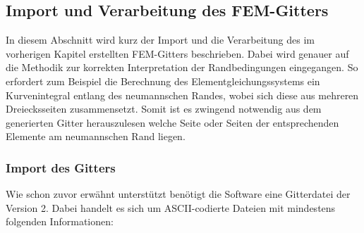 \subsection{Import und Verarbeitung des FEM-Gitters}
In diesem Abschnitt wird kurz der Import und die Verarbeitung des im vorherigen Kapitel erstellten FEM-Gitters beschrieben. Dabei wird genauer auf die Methodik zur korrekten Interpretation der Randbedingungen eingegangen. So erfordert zum Beispiel die Berechnung des Elementgleichungssystems ein Kurvenintegral entlang des neumannschen Randes, wobei sich diese aus mehreren Dreiecksseiten zusammensetzt. Somit ist es zwingend notwendig aus dem generierten Gitter herauszulesen welche Seite oder Seiten der entsprechenden Elemente am neumannschen Rand liegen.

\subsubsection{Import des Gitters}
Wie schon zuvor erwähnt unterstützt benötigt die Software eine Gitterdatei der Version 2. Dabei handelt es sich um ASCII-codierte Dateien mit mindestens folgenden Informationen:


